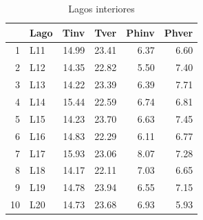 \documentclass{beamer}\usepackage[]{graphicx}\usepackage[]{color}
\begin{document}
\begin{frame}[fragile]



\begin{tiny}
\begin{table}[ht]
\centering
\begin{tabular}{rlrrrr}
  \hline
 & Lago & Tinv & Tver & Phinv & Phver \\ 
  \hline
1 & L11 & 14.99 & 23.41 & 6.37 & 6.60 \\ 
  2 & L12 & 14.35 & 22.82 & 5.50 & 7.40 \\ 
  3 & L13 & 14.22 & 23.39 & 6.39 & 7.71 \\ 
  4 & L14 & 15.44 & 22.59 & 6.74 & 6.81 \\ 
  5 & L15 & 14.23 & 23.70 & 6.63 & 7.45 \\ 
  6 & L16 & 14.83 & 22.29 & 6.11 & 6.77 \\ 
  7 & L17 & 15.93 & 23.06 & 8.07 & 7.28 \\ 
  8 & L18 & 14.17 & 22.11 & 7.03 & 6.65 \\ 
  9 & L19 & 14.78 & 23.94 & 6.55 & 7.15 \\ 
  10 & L20 & 14.73 & 23.68 & 6.93 & 5.93 \\ 
   \hline
\end{tabular}
\caption{Lagos interiores} 
\end{table}

\end{tiny}

\end{frame}
\end{document}
